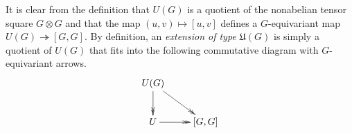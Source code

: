 \documentclass[oneside, 12pt]{amsart}
\theoremstyle{plain}
\numberwithin{equation}{section}
\numberwithin{lemma}{section}
\theoremstyle{remark}
\theoremstyle{definition}
\begin{document}
It is clear from the definition that $U(G)$ is a quotient of the nonabelian tensor square $G\otimes G$ and that
the map $(u, v) \mapsto [u, v]$ defines a $G$-equivariant map $U(G) \twoheadrightarrow [G, G]$.
By definition, an {\it extension of type $\mathfrak{U}(G)$} is simply a quotient of $U(G)$
 that fits into the following commutative diagram with $G$-equivariant arrows.
\[ \xymatrix{ U(G) \ar@{->>}[rd] \ar@{->>}[d] & \\ U \ar@{->>}[r] & [G, G]} \]

\begin{comment}
There is a correspondence between extensions of type $\mathfrak{H}_n(G)$ and $\mathfrak{U}(G)$.
One can obtain a $\mathfrak{U}(G)$-extension from given $\mathfrak{H}_n(G)$-extension via restriction.
Indeed, let $H$ be an extension of type $\mathfrak{H}_n(G)$ and $k$ be arbitrary number $1\leq k\leq n$.
Denote by $\iota_k$ the inclusion map $[G, G] \to D_n(G)$ that inserts an element $g \in [G, G]$ at the $k$-th position.
Then the corresponding extension $U$ is simply the pull-back of $H$ with respect to $\iota_k$.
\[ \xymatrix{ U \ar[d] \ar@{->>}[r]^{\pi_U} & [G, G] \ar[d]^{\iota_k} \\ H \ar@{->>}[r]^{\pi_H} & D_n(G).} \]

In more down-to-earth terms $U$ can be described as the subgroup of $H$ generated by 
symbols $c_{k}(u, v)=h_{kj}(u) \cdot h_{kj}(v) \cdot h_{kj}(vu)^{-1}$ 
 (here $j$ is any index not equal $k$, $c_k(u,v)$ does not depend on $j$, see~\cite[Proposition~2.1]{Reh78}).
It can be shown that $U$ is an extension of type $\mathfrak{U}(G)$ with kernel~$\mathrm{Ker}(\pi_U)$ 
 isomorphic to $\mathrm{Ker}(\pi_H)$, see~\cite[Propositions~2.2--2.3]{Reh78}.
In~\cite[\S~3]{Reh78} Rehmann also describes the inverse construction which assign to every $\mathfrak{U}(G)$-extension
 $U\twoheadrightarrow [G, G]$ and a number $n\geq 3$ an extension $H$ of type $\mathfrak{H}_n(G)$ that fits into the same pull-back diagram.
\end{comment}
\end{document}
